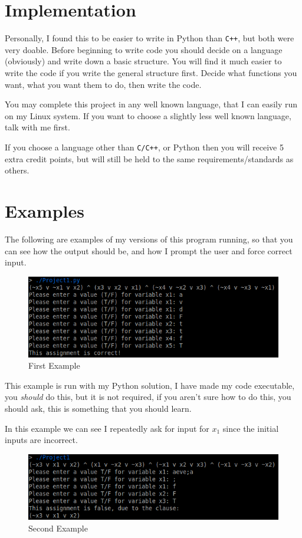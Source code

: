 \documentclass{article}
\begin{document}
\section{Implementation}
Personally, I found this to be easier to write in Python than \texttt{C++}, but
both were very doable. Before beginning to write code you should decide on a
language (obviously) and write down a basic structure. You will find it much
easier to write the code if you write the general structure first. Decide what
functions you want, what you want them to do, then write the code.

You may complete this project in any well known language, that I can easily run
on my Linux system. If you want to choose a slightly less well known language,
talk with me first.

If you choose a language other than \texttt{C/C++}, or Python then you will
receive 5 extra credit points, but will still be held to the same
requirements/standards as others.

\section{Examples}
The following are examples of my versions of this program running, so that you
can see how the output should be, and how I prompt the user and force correct
input.

\begin{figure}[H]
  \centering
  \includegraphics[width=\linewidth]{Ex1}
  \caption{First Example}
  \label{fig:Ex1}
\end{figure}
This example is run with my Python solution, I have made my code executable, you
\emph{should} do this, but it is not required, if you aren't sure how to do
this, you should ask, this is something that you should learn.

In this example we can see I repeatedly ask for input for $x_1$ since the
initial inputs are incorrect. 

\begin{figure}[H]
  \centering
  \includegraphics[width=\linewidth]{Ex2}
  \caption{Second Example}
  \label{fig:Ex2}
\end{figure}
\end{document}
